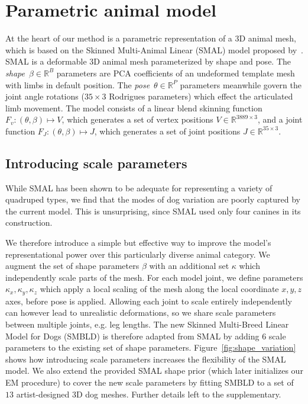   
  
  \section{Parametric animal model}
  
  \def\R#1{{\mathbb{R}^{#1}}}
  \def\RR#1#2{{\mathbb{R}^{#1 \times #2}}}
  \def\posn{\phi}
  \def\pose{\theta}
  \def\npose{P}
  \def\shape{\beta}
  \def\scale{\kappa}
  \def\trans{t}
  \def\betacov{{\Sigma_{\beta}}}
  \def\posecov{{\Sigma_{\pose}}}
  \def\posemean{{\mu_{\pose}}}
  \def\betamean{{\mu_{\beta}}}
  \def\nimages{N}
  \def\nshape{B}
  \def\verts{\nu}
  \def\nverts{V}
  \def\jointselect{\mathtt{K}}
  \def\njoints{J}
  \def\f{f}
  
  At the heart of our method is a parametric representation of a 3D animal mesh, which is based on the Skinned Multi-Animal Linear (SMAL) model proposed by~\cite{DBLP:journals/corr/ZuffiKJB16}. SMAL is a deformable 3D animal mesh parameterized by shape and pose. The \emph{shape}~$\shape \in \R\nshape$ parameters are PCA coefficients of an undeformed template mesh with limbs in default position. The \emph{pose}~$\pose \in \R\npose$ parameters meanwhile govern the joint angle rotations ($35 \times 3$ Rodrigues parameters) which effect the articulated limb movement. The model consists of a linear blend skinning function $F_{v}: (\pose, \shape) \mapsto V$, which generates a set of vertex positions $V \in \RR{3889}{3}$, and a joint function $F_{J}: (\pose, \shape) \mapsto J$, which generates a set of joint positions $J \in \RR{35}{3}$.
  
  \subsection{Introducing scale parameters}
  While SMAL has been shown to be adequate for representing a variety of quadruped types, we find that the modes of dog variation are poorly captured by the current model. This is unsurprising, since SMAL used only four canines in its construction.
  
  We therefore introduce a simple but effective way to improve the model's representational power over this particularly diverse  animal category. We augment the set of shape parameters $\beta$ with an additional set $\scale$ which independently scale parts of the mesh. For each model joint, we define parameters ${\scale_x,\scale_y,\scale_z}$ which apply a local scaling of the mesh along the local coordinate $x, y, z$ axes, before pose is applied. Allowing each joint to scale entirely independently can however lead to unrealistic deformations, so we share scale parameters between multiple joints, e.g. leg lengths. The new Skinned Multi-Breed Linear Model for Dogs (SMBLD) is therefore adapted from SMAL by adding $6$ scale parameters to the existing set of shape parameters. Figure~\ref{fig:shape_variation} shows how introducing scale parameters increases the flexibility of the SMAL model. We also extend the provided SMAL shape prior (which later initializes our EM procedure) to cover the new scale parameters by fitting SMBLD to a set of $13$ artist-designed 3D dog meshes. Further details left to the supplementary.
  
